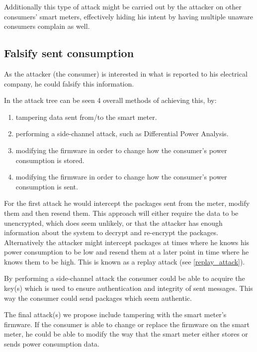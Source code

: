 Additionally this type of attack might be carried out by the attacker on other consumers' smart meters, effectively hiding his intent by having multiple unaware consumers complain as well.

\subsection{Falsify sent consumption}
As the attacker (the consumer) is interested in what is reported to his electrical company, he could falsify this information.

In the attack tree can be seen 4 overall methods of achieving this, by:
\begin{enumerate}
  \item tampering data sent from/to the smart meter.
  \item performing a side-channel attack, such as Differential Power Analysis.
  \item modifying the firmware in order to change how the consumer's power consumption is stored.
  \item modifying the firmware in order to change how the consumer's power consumption is sent.
\end{enumerate}

For the first attack he would intercept the packages sent from the meter, modify them and then resend them.
This approach will either require the data to be unencrypted, which does seem unlikely, or that the attacker has enough information about the system to decrypt and re-encrypt the packages.
Alternatively the attacker might intercept packages at times where he knows his power consumption to be low and resend them at a later point in time where he knows them to be high.
This is known as a replay attack (see \cref{replay_attack}).

By performing a side-channel attack the consumer could be able to acquire the key(s) which is used to ensure authentication and integrity of sent messages.
This way the consumer could send packages which seem authentic.

The final attack(s) we propose include tampering with the smart meter's firmware.
If the consumer is able to change or replace the firmware on the smart meter, he could be able to modify the way that the smart meter either stores or sends power consumption data.
